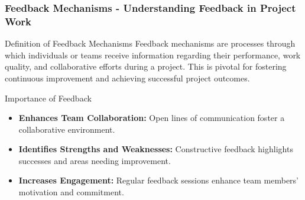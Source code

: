 \documentclass[aspectratio=169]{beamer}
\begin{document}
\begin{frame}[fragile]
    \frametitle{Feedback Mechanisms - Understanding Feedback in Project Work}
    \begin{block}{Definition of Feedback Mechanisms}
        Feedback mechanisms are processes through which individuals or teams receive information regarding their performance, work quality, and collaborative efforts during a project. This is pivotal for fostering continuous improvement and achieving successful project outcomes.
    \end{block}
    
    \begin{block}{Importance of Feedback}
        \begin{itemize}
            \item \textbf{Enhances Team Collaboration:} Open lines of communication foster a collaborative environment.
            \item \textbf{Identifies Strengths and Weaknesses:} Constructive feedback highlights successes and areas needing improvement.
            \item \textbf{Increases Engagement:} Regular feedback sessions enhance team members' motivation and commitment.
        \end{itemize}
    \end{block}
\end{frame}
\end{document}
